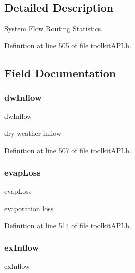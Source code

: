 \subsection{Detailed Description}
System Flow Routing Statistics. 

Definition at line 505 of file toolkit\+A\+P\+I.\+h.



\subsection{Field Documentation}
\mbox{\label{struct_s_m___routing_totals_a2ba50058866e2c864a95e5d8f91ec880}} 
\subsubsection{\texorpdfstring{dwInflow}{dwInflow}}
{\footnotesize\ttfamily dw\+Inflow}

dry weather inflow 

Definition at line 507 of file toolkit\+A\+P\+I.\+h.

\mbox{\label{struct_s_m___routing_totals_a041b11f3c42dc3f9ffe2d3112e3ecc0e}} 
\subsubsection{\texorpdfstring{evapLoss}{evapLoss}}
{\footnotesize\ttfamily evap\+Loss}

evaporation loss 

Definition at line 514 of file toolkit\+A\+P\+I.\+h.

\mbox{\label{struct_s_m___routing_totals_a16d57de84cbbf43c3bd19fd011792c1b}} 
\subsubsection{\texorpdfstring{exInflow}{exInflow}}
{\footnotesize\ttfamily ex\+Inflow}


